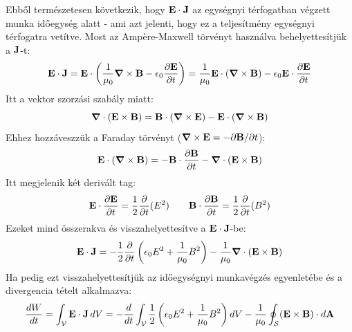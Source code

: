 \documentclass[a4paper,12pt]{article}
\begin{document}
Ebből természetesen következik, hogy $\bold{E} \cdot \bold{J}$ az egységnyi térfogatban végzett munka időegység alatt - ami azt jelenti, hogy ez a teljesítmény egységnyi térfogatra vetítve.
Most az Ampère-Maxwell törvényt használva behelyettesítjük a $\bold{J}$-t:
\begin{equation}
    \bold{E} \cdot \bold{J} = \bold{E} \cdot \left( \frac{1}{\mu_0} \boldsymbol{\nabla} \times \bold{B} - \epsilon_0 \frac{\partial \bold{E}}{\partial t} \right) = \frac{1}{\mu_0} \bold{E} \cdot (\boldsymbol{\nabla} \times \bold{B}) - \epsilon_0 \bold{E} \cdot \frac{\partial \bold{E}}{\partial t}
\end{equation}
Itt a vektor szorzási szabály miatt:
\begin{equation}
    \boldsymbol{\nabla} \cdot (\bold{E} \times \bold{B}) = \bold{B} \cdot (\boldsymbol{\nabla} \times \bold{E}) - \bold{E} \cdot (\boldsymbol{\nabla} \times \bold{B})
\end{equation}
Ehhez hozzáveszzük a Faraday törvényt ($\boldsymbol{\nabla} \times \bold{E} = - \partial \bold{B} / \partial t$):
\begin{equation}
    \bold{E} \cdot (\boldsymbol{\nabla} \times \bold{B}) = - \bold{B} \cdot \frac{\partial \bold{B}}{\partial t} - \boldsymbol{\nabla} \cdot (\bold{E} \times \bold{B})
\end{equation}
Itt megjelenik két derivált tag:
\begin{equation}
    \bold{E} \cdot \frac{\partial \bold{E}}{\partial t} = \frac{1}{2} \frac{\partial }{\partial t} (E^2) \qquad \bold{B} \cdot \frac{\partial \bold{B}}{\partial t} = \frac{1}{2} \frac{\partial }{\partial t} (B^2)
\end{equation}
Ezeket mind összerakva és visszahelyettesítve a $\bold{E} \cdot \bold{J}$-be:
\begin{equation}
    \bold{E} \cdot \bold{J} = - \frac{1}{2} \frac{\partial}{\partial t} \left( \epsilon_0 E^2 + \frac{1}{\mu_0} B^2 \right) - \frac{1}{\mu_0} \boldsymbol{\nabla} \cdot (\bold{E} \times \bold{B})
\end{equation}
Ha pedig ezt visszahelyettesítjük az időegységnyi munkavégzés egyenletébe és a divergencia tételt alkalmazva:
\begin{equation}
    \frac{dW}{dt} = \int_{\mathcal{V}} \bold{E} \cdot \bold{J} \, dV = - \frac{d}{dt} \int_{\mathcal{V}} \frac{1}{2} \left( \epsilon_0 E^2 + \frac{1}{\mu_0} B^2 \right) dV - \frac{1}{\mu_0} \oint_{\mathcal{S}} (\bold{E} \times \bold{B}) \cdot d\bold{A}
\end{equation}
\end{document}
